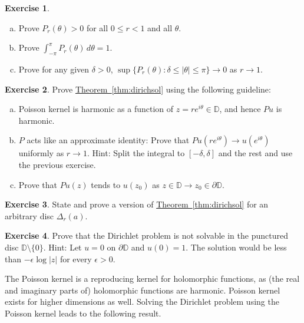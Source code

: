 \documentclass[12pt,openany]{book}
\newcommand{\sabs}[1]{\lvert {#1} \rvert}
\newcommand{\abs}[1]{\left\lvert {#1} \right\rvert}
\newcommand{\D}{{\mathbb{D}}}
\theoremstyle{plain}
\theoremstyle{remark}
\theoremstyle{definition}
\newenvironment{exbox}{%
    \def\FrameCommand{\vrule width 1pt \relax\hspace{10pt}}%
    \MakeFramed{\advance\hsize-\width\FrameRestore}%
}{%
    \endMakeFramed
}
\newenvironment{exparts}{%
    \leavevmode\begin{enumerate}[a),noitemsep,topsep=0pt,parsep=0pt,partopsep=0pt]
}{%
    \end{enumerate}
}
\theoremstyle{exercise}
\newtheorem{exercise}{Exercise}[section]
\theoremstyle{example}
\newcommand{\thmref}[1]{\hyperref[#1]{Theorem~\ref*{#1}}}
\begin{document}
\begin{exbox}
\begin{exercise}
\begin{exparts}
\item
Prove $P_r(\theta) > 0$ for all $0 \leq r < 1$ and all $\theta$.
\item
Prove $\int_{-\pi}^{\pi} P_r(\theta) \, d\theta = 1$.
\item
Prove for any given $\delta > 0$,
$\sup \{P_r(\theta) : \delta \leq \abs{\theta} \leq \pi \} \to 0$ as
$r \to 1$.
\end{exparts}
\end{exercise}

\begin{exercise}
\pagebreak[1]%
Prove \thmref{thm:dirichsol} using the following guideline:
\begin{exparts}
\item
Poisson kernel is harmonic
as a function of $z=re^{i\theta} \in \D$, and hence
$Pu$ is harmonic.
\item
$P$ acts like an
approximate identity: Prove that
$Pu(re^{i\theta}) \to u(e^{i\theta})$ uniformly as
$r \to 1$.  Hint: Split the integral to $[-\delta,\delta]$ and the rest
and use the previous exercise.
\item
Prove that $Pu(z)$ tends to $u(z_0)$ as
$z \in \D \to z_0 \in \partial \D$.
\end{exparts}
\end{exercise}

\begin{exercise}
\pagebreak[2]%
State and prove a version of \thmref{thm:dirichsol} for an arbitrary disc
$\Delta_r(a)$.
\end{exercise}

\begin{exercise}
Prove that the Dirichlet problem is not solvable in the punctured disc $\D
\setminus \{ 0 \}$.
Hint: Let $u = 0$ on $\partial \D$ and $u(0)=1$.
The solution would be
less than $- \epsilon \log \sabs{z}$ for every $\epsilon > 0$.
\end{exercise}
\end{exbox}

The Poisson kernel is a reproducing kernel for
holomorphic functions, as (the real and imaginary parts of) holomorphic functions are harmonic.
Poisson kernel exists for higher dimensions as well.
Solving the Dirichlet problem using the Poisson kernel leads to
the following result.
\end{document}
